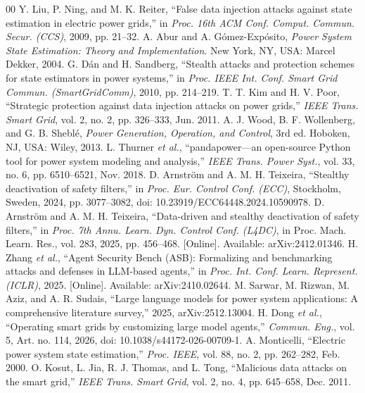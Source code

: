 \documentclass{ieeeaccess}
\begin{document}
\begin{thebibliography}{00}
 Y. Liu, P. Ning, and M. K. Reiter, ``False data injection attacks against state estimation in electric power grids,'' in \emph{Proc. 16th ACM Conf. Comput. Commun. Secur. (CCS)}, 2009, pp. 21--32.
 A. Abur and A. G\'omez-Exp\'osito, \emph{Power System State Estimation: Theory and Implementation}. New York, NY, USA: Marcel Dekker, 2004.
 G. D\'an and H. Sandberg, ``Stealth attacks and protection schemes for state estimators in power systems,'' in \emph{Proc. IEEE Int. Conf. Smart Grid Commun. (SmartGridComm)}, 2010, pp. 214--219.
 T. T. Kim and H. V. Poor, ``Strategic protection against data injection attacks on power grids,'' \emph{IEEE Trans. Smart Grid}, vol. 2, no. 2, pp. 326--333, Jun. 2011.
 A. J. Wood, B. F. Wollenberg, and G. B. Shebl\'e, \emph{Power Generation, Operation, and Control}, 3rd ed. Hoboken, NJ, USA: Wiley, 2013.
 L. Thurner \emph{et al.}, ``pandapower---an open-source Python tool for power system modeling and analysis,'' \emph{IEEE Trans. Power Syst.}, vol. 33, no. 6, pp. 6510--6521, Nov. 2018.
 D. Arnstr\"om and A. M. H. Teixeira, ``Stealthy deactivation of safety filters,'' in \emph{Proc. Eur. Control Conf. (ECC)}, Stockholm, Sweden, 2024, pp. 3077--3082, doi: 10.23919/ECC64448.2024.10590978.
 D. Arnstr\"om and A. M. H. Teixeira, ``Data-driven and stealthy deactivation of safety filters,'' in \emph{Proc. 7th Annu. Learn. Dyn. Control Conf. (L4DC)}, in Proc. Mach. Learn. Res., vol. 283, 2025, pp. 456--468. [Online]. Available: arXiv:2412.01346.
 H. Zhang \emph{et al.}, ``Agent Security Bench (ASB): Formalizing and benchmarking attacks and defenses in LLM-based agents,'' in \emph{Proc. Int. Conf. Learn. Represent. (ICLR)}, 2025. [Online]. Available: arXiv:2410.02644.
 M. Sarwar, M. Rizwan, M. Aziz, and A. R. Sudais, ``Large language models for power system applications: A comprehensive literature survey,'' 2025, arXiv:2512.13004.
 H. Dong \emph{et al.}, ``Operating smart grids by customizing large model agents,'' \emph{Commun. Eng.}, vol. 5, Art. no. 114, 2026, doi: 10.1038/s44172-026-00709-1.
 A. Monticelli, ``Electric power system state estimation,'' \emph{Proc. IEEE}, vol. 88, no. 2, pp. 262--282, Feb. 2000.
 O. Kosut, L. Jia, R. J. Thomas, and L. Tong, ``Malicious data attacks on the smart grid,'' \emph{IEEE Trans. Smart Grid}, vol. 2, no. 4, pp. 645--658, Dec. 2011.

\end{thebibliography}
\end{document}
